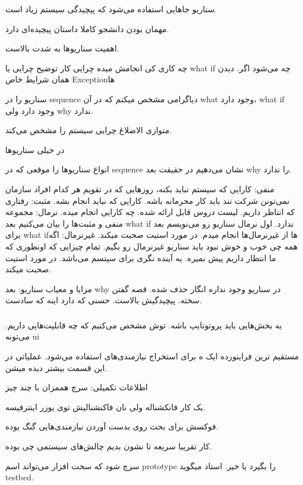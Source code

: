 سناریو جاهایی استفاده می‌شود که پیچیدگی سیستم زیاد است.

مهمان بودن دانشجو کاملا داستان پیچیده‌ای دارد.

اهمیت سناریو‌ها به شدت بالاست.

چه کاری
کی انجامش میده
چرایی کار 
توضیح چرایی یا what if چه می‌شود اگر. دیدن همان شرایط خاص Exceptionها

سناریو را در sequence دیاگرامی مشخص میکنم که در آن what وجود دارد، what if وجود
دارد ولی why ندارد.

متوازی الاضلاغ چرایی سیستم را مشخص می‌کند.

در خیلی سناریو‌ها 

انواع سناریو‌ها را موقعی که در sequence نشان می‌دهیم در حقیقت بعد why را ندارد.

منفی: کارایی که سیستم نباید بکنه، روز‌هایی که در تقویم هر کدام افراد سازمان
نمی‌تونن شرکت نند باید کار محرمانه باشه. کارایی که نباید انجام بشه.
مثبت: رفتاری که انتاظر داریم. لیست دروس قابل ارائه شده. چه کارایی انجام میده.
نرمال: مجموعه منفی و مثبت‌ها را بیان می‌کنیم بعد what if ندارد. اول نرمال سناریو
رو می‌نویسم بعد برای what ifها از غیرنرمال‌ها انجام میدم. در مورد استیت صحبت میکند.
غیرنرمال: اگه همه چی خوب و خوش نبود باید سناریو غیرنرمال رو بگیم. تمام چیزایی که
اونطوری که ما انتظار داریم پیش نمیره. یه آینده نگری برای سیتسم می‌باشد. در مورد
استیت صحبت میکند.

مزایا و معیاب سناریو:
بعد why در سناریو وجود نداره انگار حذف شده.
قصه گفتن سخته. پیچیدگیش بالاست.
حسنی که دارد اینه که سادست.


\subsubsection{}

یه بخش‌هایی باید پروتوتایپ باشه. توش مشخص می‌کنیم که چه قابلیت‌هایی داریم.
می‌تونه ui

مستقیم ترین فراینورده ایک ه برای استخراج نیازمندی‌های استفاده می‌شود. عملیاتی در
این قسمت بیشتر دیده میشن.

اطلاعات تکمیلی:
سرچ هممزان با چند چیز

یک کار فانکشناله ولی نان فاکنشنالیش توی یوزر اینترفیسه.

فوکسش برای بحث روی بدست آوردن نیازمندی‌هایی گنگ بوده.

کار تقریبا سریعه تا نشون بدیم چالش‌های سیستمی چی بوده.

سرچ شود که سخت افزار می‌تواند اسم prototype را بگیرد یا خیر. استاد میگوید
testbed.

